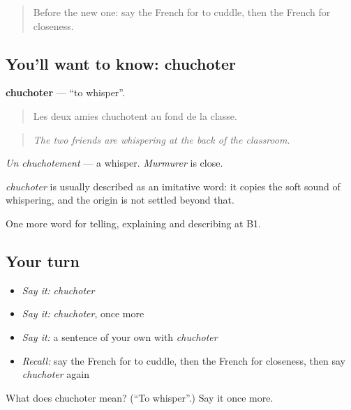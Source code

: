\begin{quote}
Before the new one: say the French for to cuddle, then the French for closeness.
\end{quote}

\subsection*{You'll want to know: chuchoter}
\textbf{chuchoter} — \textquotedblleft{}to whisper\textquotedblright{}.

\begin{quote}
Les deux amies chuchotent au fond de la classe.
\end{quote}

\begin{quote}
\emph{The two friends are whispering at the back of the classroom.}
\end{quote}

\emph{Un chuchotement} — a whisper. \emph{Murmurer} is close.

\begin{cousinweb}
\emph{chuchoter} is usually described as an imitative word: it copies the soft sound of whispering, and the origin is not settled beyond that.
\end{cousinweb}

\begin{grammarlens}[title={What you've built}]
One more word for telling, explaining and describing at B1.
\end{grammarlens}

\subsection*{Your turn}
\begin{itemize}
\raggedright
  \item \emph{Say it:} \emph{chuchoter}
  \item \emph{Say it:} \emph{chuchoter}, once more
  \item \emph{Say it:} a sentence of your own with \emph{chuchoter}
  \item \emph{Recall:} say the French for to cuddle, then the French for closeness, then say \emph{chuchoter} again
\end{itemize}

\begin{tcolorbox}[breakable,colback=teal!4,colframe=teal!35!black,title={Before you move on}]
What does chuchoter mean? (\textquotedblleft{}To whisper\textquotedblright{}.) Say it once more.
\end{tcolorbox}
